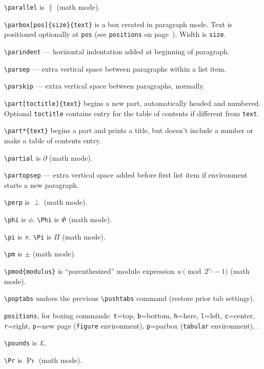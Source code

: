 \verb"\parallel" is $\parallel$ (math mode).

\verb"\parbox[pos]{size}{text}" is a box created in paragraph mode. Text is
	positioned optionally at \verb"pos" (see \verb"positions" on
	page~\pageref{pos-ref}). Width is \verb"size".

\verb"\parindent" --- horizontal indentation added at beginning of paragraph.

\verb"\parsep" --- extra vertical space between paragraphs within a list item.

\verb"\parskip" --- extra vertical space between paragraphs, normally.

\verb"\part[toctitle]{text}" begins a new part, automatically headed and
	numbered.  Optional \verb"toctitle" contains entry for the
	table of contents if different from \verb"text".

\verb"\part*{text}" begins a part and prints a title, but doesn't include
	a number or make a table of contents entry.

\verb"\partial" is $\partial$ (math mode).

\verb"\partopsep" --- extra vertical space added before first list item if
	environment starts a new paragraph.

\verb"\perp" is $\perp$ (math mode).

\verb"\phi" is $\phi$. \verb"\Phi" is $\Phi$ (math mode).

\verb"\pi" is $\pi$. \verb"\Pi" is $\Pi$ (math mode).

\verb"\pm" is $\pm$ (math mode).

\verb"\pmod{modulus}" is ``parenthesized'' modulo expression
	$u \pmod{2^{e_j}-1}$ (math mode).

\verb"\poptabs" undoes the previous \verb"\pushtabs" command (restore
	prior tab settings).

\verb"positions", for boxing commands: \verb"t"=top, \verb"b"=bottom,
	\verb"h"=here, \verb"l"=left, \verb"c"=center, \verb"r"=right,
	\verb"p"=new page (\verb"figure" environment),
	\verb"p"=parbox (\verb"tabular" environment), .
\label{pos-ref}

\verb"\pounds" is \pounds.

\verb"\Pr" is $\Pr$ (math mode).

